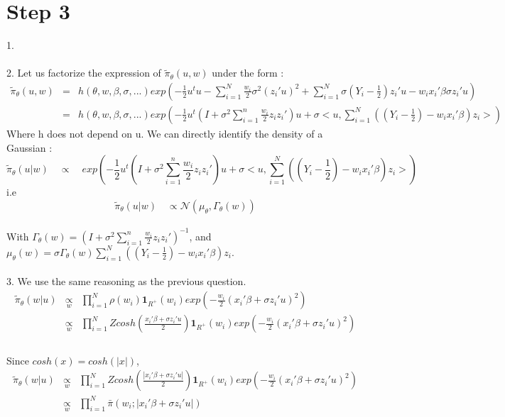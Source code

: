 \section*{Step 3}
1.~\\
~\\
2. Let us factorize the expression of $\tilde{\pi}_{\theta}(u,w)$  under the form :
\begin{eqnarray*}
	\tilde{\pi}_{\theta}(u,w)&=& h(\theta,  w, \beta, \sigma , ...) exp(-\frac{1}{2}u^t u - \sum_{i=1}^{N}\frac{ w_i}{2}\sigma^2(z_i'u)^2 +\sum_{i=1}^{N}\sigma(Y_i-\frac{1}{2})z_i'u- w_{i}x_i'\beta \sigma z_i'u)~\\
	&=& h(\theta,  w, \beta, \sigma , ...)exp(-\frac{1}{2}u^t (I+\sigma^{2}\sum_{i=1}^{n}\frac{ w_i}{2}z_i z_i')u + \sigma<u, \sum_{i=1}^{N}((Y_i-\frac{1}{2})- w_{i}x_i'\beta)z_i>)
	\end{eqnarray*}
Where h does not depend on u. We can directly identify the density of a Gaussian :
$$ \tilde{\pi}_{\theta}(u | w) \quad \propto \quad exp(-\frac{1}{2}u^t (I+\sigma^{2}\sum_{i=1}^{n}\frac{ w_i}{2}z_i z_i')u + \sigma<u, \sum_{i=1}^{N}((Y_i-\frac{1}{2})- w_{i}x_i'\beta)z_i>)$$
i.e
$$ \boxed{\tilde{\pi}_{\theta}(u | w) \quad \propto \mathcal{N}(\mu_{\theta},\Gamma_{\theta}(w))}$$
~\\
With $\boxed{\Gamma_{\theta}(w)=(I+\sigma^{2}\sum_{i=1}^{n}\frac{ w_i}{2}z_i z_i')^{-1}}$, and $\boxed{\mu_{\theta}(w)=\sigma \Gamma_{\theta}(w)\sum_{i=1}^{N}((Y_i-\frac{1}{2})-w_ix_i'\beta)z_i}$.~\\
~\\
3. We use the same reasoning as the previous question. 
\begin{eqnarray*}
	\tilde{\pi}_{\theta}(w | u) & \underset{w}\propto & \prod_{i=1}^{N}\rho(w_i)\textbf{1}_{R^{+}}(w_i)exp(-\frac{w_i}{2}(x_i'\beta+\sigma z_i'u)^2) \\
	& \underset{w}\propto & \prod_{i=1}^{N}Zcosh(\frac{x_i'\beta + \sigma z_i'u}{2})\textbf{1}_{R^{+}}(w_i)exp(-\frac{w_i}{2}(x_i'\beta+\sigma z_i'u)^2)\\
	\end{eqnarray*}~\\
	Since $cosh(x)=cosh(|x|)$,
\begin{eqnarray*}
	\tilde{\pi}_{\theta}(w | u)
	& \underset{w}\propto & \prod_{i=1}^{N}Zcosh(\frac{|x_i'\beta + \sigma z_i'u|}{2})\textbf{1}_{R^{+}}(w_i)exp(-\frac{w_i}{2}(x_i'\beta+\sigma z_i'u)^2)\\
	& \underset{w}\propto & \prod_{i=1}^{N}\bar{\pi}(w_i ;|x_i'\beta + \sigma z_i' u|)
\end{eqnarray*}~\\
